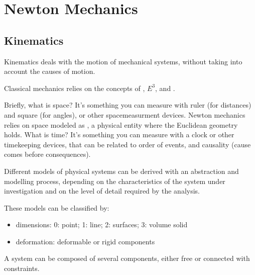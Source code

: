 \documentclass[letterpaper,10pt,english]{jupyterBook}
\begin{document}
\part{Newton Mechanics}

\sphinxstepscope


\chapter{Kinematics}
\label{\detokenize{ch/kinematics:kinematics}}\label{\detokenize{ch/kinematics:classical-mechanics-kinematics}}\label{\detokenize{ch/kinematics::doc}}
\sphinxAtStartPar
Kinematics deals with the motion of mechanical systems, without taking into account the causes of motion.



\sphinxAtStartPar
Classical mechanics relies on the concepts of , \(E^3\), and .

\sphinxAtStartPar
{} Briefly, what is space? It’s something you can measure with ruler (for distances) and square (for angles), or other space\sphinxhyphen{}measurment devices. Newton mechanics relies on space modeled as , a physical entity where the Euclidean geometry holds.
What is time? It’s something you can measure with a clock or other timekeeping devices, that can be related to order of events, and causality (cause comes before consequences).



\sphinxAtStartPar
{} Different models of physical systems can be derived with an abstraction and modelling process, depending on the characteristics of the system under investigation and on the level of detail required by the analysis.

\sphinxAtStartPar
These models can be classified by:
\begin{itemize}
\item {} 
\sphinxAtStartPar
dimensions: 0: point; 1: line; 2: surfaces; 3: volume solid

\item {} 
\sphinxAtStartPar
deformation: deformable or rigid components

\end{itemize}

\sphinxAtStartPar
A system can be composed of several components, either free or connected with constraints.
\end{document}
